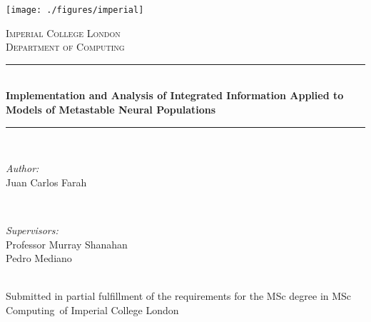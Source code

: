 \documentclass[a4paper,11pt]{article}
\newcommand{\reporttitle}{Implementation and Analysis of Integrated Information Applied to Models of Metastable Neural Populations}
\newcommand{\reportauthor}{Juan Carlos Farah}
\newcommand{\supervisor}{Professor Murray Shanahan\\Pedro Mediano}
\newcommand{\degreetype}{MSc Computing}
\begin{document}
\newcommand{\HRule}{\rule{\linewidth}{0.5mm}}


\texttt{[image: ./figures/imperial]}\\[0.5cm]

\begin{center}


\textsc{\Large Imperial College London}\\[0.5cm]
\textsc{\large Department of Computing}\\[0.5cm]


\HRule \\[0.4cm]
{ \huge \bfseries \reporttitle}\\
\HRule \\[1.5cm]


\begin{minipage}{0.4\textwidth}
\begin{flushleft} \large
\emph{Author:}\\
\reportauthor
\end{flushleft}
\end{minipage}
~
\begin{minipage}{0.4\textwidth}
\begin{flushright} \large
\emph{Supervisors:} \\
\supervisor
\end{flushright}
\end{minipage}\\[4cm]

\vfill %
Submitted in partial fulfillment of the requirements for the MSc degree in
\degreetype~of Imperial College London\\[0.5cm]

\makeatletter
\@date
\makeatother

\end{center}
\clearpage
\end{document}
